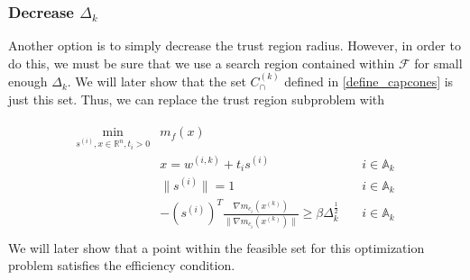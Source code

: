 \documentclass{article}
\newenvironment{comment}
  {\par\medskip
   \color{red}%
   \begin{framed}
   \textbf{Comment: }\ignorespaces}
 {\end{framed}
  \medskip}
\theoremstyle{case}
\newcommand{\activeconstraintsk}{{\mathbb A_{k}}}
\newcommand{\capcones}{{C^{(k)}_{\cap}}}
\newcommand{\dk}{\Delta_k}
\newcommand{\feasible}{{\mathcal F}}
\newcommand{\hgik}{{\frac{\nabla m_{c_i}(\xk)}{\|\nabla m_{c_i}(\xk)\|}}}
\newcommand{\mcik}{{{m}_{c_i}}^{(k)}}
\newcommand{\mfk}{{{m}_f}^{(k)}}
\newcommand{\reals}{\mathbb R}
\newcommand{\Rn}{\mathbb R^n}
\newcommand{\trsinfset}{{E_\text{infeasible}}}
\newcommand{\trstol}{{\delta_\text{infeasible}}}
\newcommand{\wik}{{w^{(i, k)}}}
\newcommand{\xk}{{x^{(k)}}}
\begin{document}



\subsubsection{Decrease $\dk$}

Another option is to simply decrease the trust region radius.
However, in order to do this, we must be sure that we use a search region contained within $\feasible$ for small enough $\dk$.
We will later show that the set $\capcones$ defined in \cref{define_capcones} is just this set.
Thus, we can replace the trust region subproblem with

\begin{align}
\label{capcones_tr_subproblem}
\begin{array}{ccc}
\min_{s^{(i)},x\in\Rn,t_i>0} & m_f(x) & \\
 & x = \wik + t _i s^{(i)} & \quad  i \in \activeconstraintsk \\
 & \|s^{(i)}\| = 1 & \quad i \in \activeconstraintsk \\
 & -\left(s^{(i)}\right)^T\hgik \ge \beta \dk^{\frac 1 2 } & \quad  i \in \activeconstraintsk \\
\end{array}
\end{align}
We will later show that a point within the feasible set for this optimization problem satisfies the efficiency condition.


% 
% 
% 
% 
% 
% 
\end{document}
